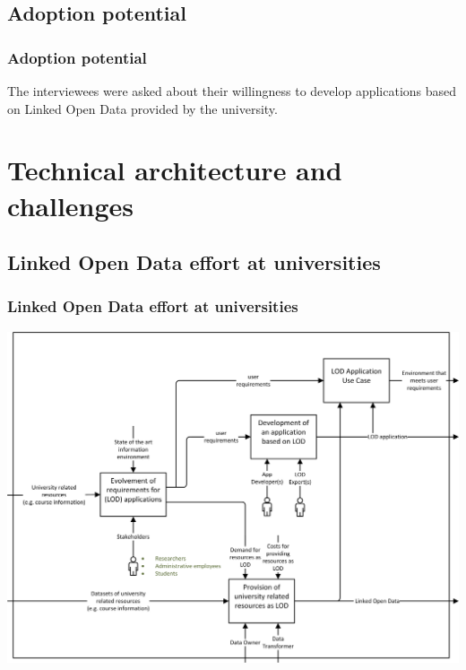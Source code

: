 \documentclass{beamer}
\begin{document}
\subsection[Adoption potential]{Adoption potential}
\begin{frame}
\frametitle{Adoption potential}
The interviewees were asked about their willingness to develop applications based on Linked Open
Data provided by the university.
\end{frame}


\section[Technical architecture and challenges]{Technical architecture and challenges}
\subsection{Linked Open Data effort at universities}
\begin{frame}
\frametitle{Linked Open Data effort at universities}
	\includegraphics[width=\columnwidth]{../images/technical-architecture/lod_at_tuwien_idef0.png}
\end{frame}
\end{document}

